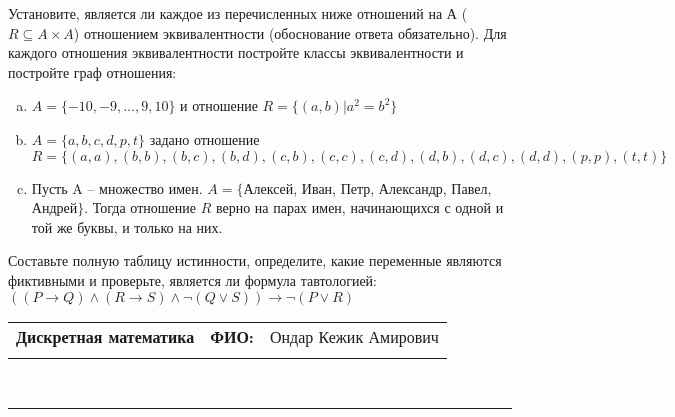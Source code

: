 \documentclass[10pt]{exam}
\newcommand{\class}{Дискретная математика}
\newcommand{\examdate}{}
\begin{document}
\begin{questions}
\question
Установите, является ли каждое из перечисленных ниже отношений на А ($R \subseteq A \times A$) отношением эквивалентности (обоснование ответа обязательно). Для каждого отношения эквивалентности постройте классы 
эквивалентности и постройте граф отношения:
\begin{enumerate} [a)]\setcounter{enumi}{0}
\item $A = \{-10, -9, … , 9, 10\}$ и отношение $R = \{(a,b)|a^{2} = b^{2}\}$
\item $A = \{a, b, c, d, p, t\}$ задано отношение $R = \{(a, a), (b, b), (b, c), (b, d), (c, b), (c, c), (c, d), (d, b), (d, c), (d, d), (p,p), (t,t)\}$
\item Пусть A – множество имен. $A = \{ $Алексей, Иван, Петр, Александр, Павел, Андрей$ \}$. Тогда отношение $R$ верно на парах имен, начинающихся с одной и той же буквы, и только на них.
\end{enumerate}\question Составьте полную таблицу истинности, определите, какие переменные являются фиктивными и проверьте, является ли формула тавтологией:
$((P \rightarrow Q) \land (R \rightarrow S) \land \neg (Q \lor S)) \rightarrow \neg (P \lor R)$

\end{questions}
\newpage
\begin{flushright}
\begin{tabular}{p{2.8in} r l}
\textbf{\class} & \textbf{ФИО:} &Ондар Кежик Амирович
\\

\textbf{\examdate} &&\\
\end{tabular}\\
\end{flushright}
\rule[1ex]{\textwidth}{.1pt}
\end{document}
